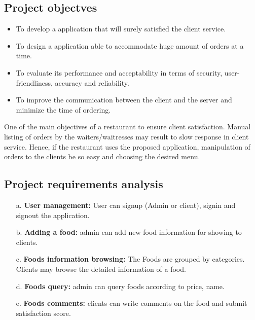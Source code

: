 \documentclass[12pt,a4paper]{article}
\newcommand\tab[1][.7cm]{\hspace*{#1}}
\begin{document}
	\subsection{Project objectves}
\tab{We are stuck with technology when what we really want is just stuff that works. With
the current paradigm shift in technological field, there is an urgent need to embrace and
appreciate the power of technology.Restaurant sector remains vigilant to face the challenges
of change by employing a new strategy that facilities easy management application that can
simplify work for the restaurant admins so that all their work can be efficient and effective.
The general objectives of the study is to develop a reliable, convenient and accurate Ordering System.\\
The study has the following specific objectives:}
		 \begin{itemize}
			\item{To develop a application that will surely satisfied the client service.}
			\item{To design a application able to accommodate huge amount of orders at a time.}
			\item{To evaluate its performance and acceptability in terms of security, user-friendliness, accuracy and reliability.}
			\item{To improve the communication between the client and the server and minimize the time of ordering.}
		\end{itemize}
		
One of the main objectives of a restaurant to ensure client satisfaction. Manual listing of orders by the waiters/waitresses may result to slow response in client service. Hence, if the restaurant uses the proposed application, manipulation of orders to the clients be so easy and choosing the desired menu.

	\subsection{Project requirements analysis}
	\tab{Project requirements analysis are important stage in the application development. It
determines the functions of the whole application integrity and stability. Software requirements
analysis is an ongoing process of understanding and progressive refinement. Through
requirements analysis, design functions of the management application as below.}
			\begin{itemize}
				\item[a.]\textbf{User management:} User can signup (Admin or client), signin and signout the application.
				\item[b.]\textbf{Adding a food:} admin can add new food information for showing to clients.
				\item[c.]\textbf{Foods information browsing:} The Foods are grouped by categories. Clients may
browse the detailed information of a food.
				\item[d.]\textbf{Foods query:} admin can query foods according to price, name.
				\item[e.]\textbf{Foods comments:} clients can write comments on the food and submit satisfaction
score.
			\end{itemize}
\end{document}
